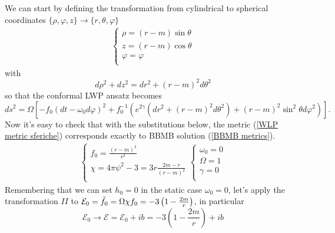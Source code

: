 We can start by defining the transformation from cylindrical to spherical coordinates $\{\rho,\varphi,z\} \rightarrow \{r,\theta,\varphi\}$
\begin{equation*}
    \begin{aligned}
        \begin{cases}
           \rho  = (r-m)\sin\theta \\
           z = (r-m)\cos\theta \\
           \varphi = \varphi \\
        \end{cases}
    \end{aligned}
    \tag{$c\rightarrow s$}
    \label{cambio cilindriche sferiche}
\end{equation*}
with 
\begin{equation}
    d\rho^2 + dz^2 = dr^2 + (r-m)^2d\theta^2
\end{equation}
so that the conformal LWP ansatz becomes 
\begin{equation}
    ds^2 = \Omega\left[-f_0 (dt - \omega_0 d\varphi)^2 + f_0^{-1}\left(e^{2\gamma}(dr^2 + (r-m)^2d\theta^2) + (r-m)^2\sin^2\theta d\varphi^2\right)\right].
    \label{WLP metric sferiche}
\end{equation}
Now it's easy to check that with the substitutions below, the metric (\ref{WLP metric sferiche}) corresponds exactly to BBMB solution (\ref{BBMB metrics}).
\begin{equation*}
    \begin{aligned}
        \begin{cases}
           \displaystyle f_0  = \frac{(r-m)^2}{r^2} \\[0.5em] 
           \displaystyle \chi = 4\pi\psi^2-3 = 3r\frac{2m-r}{(r-m)^2} \\
        \end{cases}
        \begin{cases}
            \omega_0 = 0 \\
            \Omega = 1 \\
            \gamma = 0 \\
        \end{cases}
    \end{aligned}
\end{equation*}
Remembering that we can set $h_0=0$ in the static case $\omega_0=0$, let's apply the transformation $II$ to $\mathcal{E}_0 = \Tilde{f}_0 = \Omega\chi f_0 = -3\left(1-\frac{2m}{r}\right)$, in particular
\begin{equation}
    \mathcal{E}_0 \longrightarrow \mathcal{E} = \mathcal{E}_0 +ib = -3\left(1-\frac{2m}{r}\right) + ib
\end{equation}

